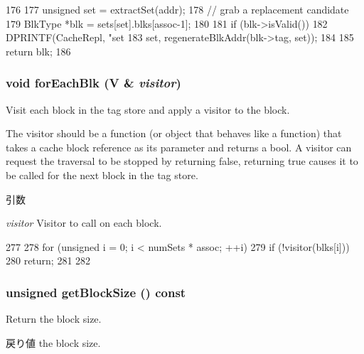 \begin{DoxyCode}
176 {
177     unsigned set = extractSet(addr);
178     // grab a replacement candidate
179     BlkType *blk = sets[set].blks[assoc-1];
180 
181     if (blk->isValid()) {
182         DPRINTF(CacheRepl, "set %
183                 set, regenerateBlkAddr(blk->tag, set));
184     }
185     return blk;
186 }
\end{DoxyCode}
\hypertarget{classLRU_a2f6fd1256bf2c210092c065ea65b83de}{
\subsubsection[{forEachBlk}]{\setlength{\rightskip}{0pt plus 5cm}void forEachBlk (V \& {\em visitor})}}
\label{classLRU_a2f6fd1256bf2c210092c065ea65b83de}
Visit each block in the tag store and apply a visitor to the block.

The visitor should be a function (or object that behaves like a function) that takes a cache block reference as its parameter and returns a bool. A visitor can request the traversal to be stopped by returning false, returning true causes it to be called for the next block in the tag store.


\begin{DoxyParams}{引数}
\item[{\em visitor}]Visitor to call on each block. \end{DoxyParams}



\begin{DoxyCode}
277                                 {
278         for (unsigned i = 0; i < numSets * assoc; ++i) {
279             if (!visitor(blks[i]))
280                 return;
281         }
282     }
\end{DoxyCode}
\hypertarget{classLRU_a38301abe4b3689f8ac7de5c13a046234}{
\subsubsection[{getBlockSize}]{\setlength{\rightskip}{0pt plus 5cm}unsigned getBlockSize () const}}
\label{classLRU_a38301abe4b3689f8ac7de5c13a046234}
Return the block size. \begin{DoxyReturn}{戻り値}
the block size. 
\end{DoxyReturn}



